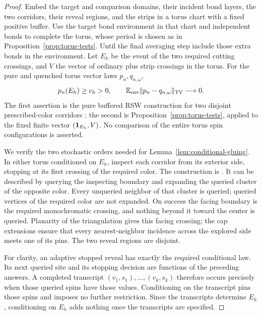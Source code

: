 \begin{proof}
Embed the target and comparison domains, their incident bond layers,
the two corridors, their reveal regions, and the strips in a torus
chart with a fixed positive buffer.  Use the target bond
environment in that chart and independent bonds to complete the
torus, whose period is chosen as in Proposition~\ref{prop:torus-tests}.
Until the final averaging step include those extra bonds in the environment.
Let $E_h$ be the event of the two required cutting crossings, and
$V$ the vector of ordinary plus strip crossings in the torus.  For
the pure and quenched torus vector laws $p_n,q_{n,\omega}$,
\begin{equation}
 p_n(E_h)\ge c_h>0,\qquad
 \mathbb E_{\rm env}\|p_n-q_{n,\omega}\|_{\operatorname{TV}}\longrightarrow0.
 \label{eq:strip-middle-laws}
\end{equation}
The first assertion is the pure buffered RSW construction for two
disjoint prescribed-color corridors
\cite[Section~2, Proposition ``Pure buffered RSW consequences'']{S};
the second is Proposition~\ref{prop:torus-tests}, applied to the
fixed finite vector $(\mathbf 1_{E_h},V)$.  No comparison of the entire
torus spin configurations is asserted.

We verify the two stochastic orders needed for
Lemma~\ref{lem:conditional-gluing}.  In either torus conditioned on
$E_h$, inspect each corridor from its exterior side, stopping at its
first crossing of the required color.  The construction is
\cite[Section~6, Lemma ``Reveals with a monochromatic facing
boundary'']{S}.  It can be described by querying the inspecting
boundary and expanding the queried cluster of the opposite color.
Every unqueried neighbor of that cluster is queried; queried vertices
of the required color are not expanded.  On success the facing
boundary is the required monochromatic crossing, and nothing beyond
it toward the center is queried.  Planarity of the triangulation
gives this facing crossing; the cap extensions ensure that every
nearest-neighbor incidence across the explored side meets one of
its pins.  The two reveal regions are disjoint.

For clarity, an adaptive stopped reveal has exactly the required
conditional law.  Its next queried site and its stopping decision are
functions of the preceding answers.  A completed transcript
$(v_1,s_1),\ldots,(v_k,s_k)$ therefore occurs precisely when those
queried spins have those values.  Conditioning on the transcript
pins those spins and imposes no further restriction.  Since the
transcripts determine $E_h$, conditioning on $E_h$ adds nothing once
the transcripts are specified.


\end{proof}
